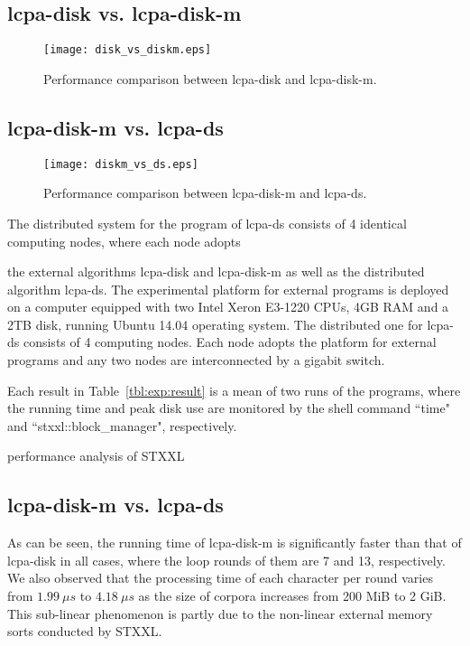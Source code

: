\documentclass[article]{IEEEtran}
\theoremstyle{definition}
\theoremstyle{remark}
\numberwithin{equation}{section}
\begin{document}
\subsection{lcpa-disk vs. lcpa-disk-m}
\begin{figure}[hbtp]
  \centering
  \texttt{[image: disk\_vs\_diskm.eps]}\\
  \caption{Performance comparison between lcpa-disk and lcpa-disk-m.}
  \label{fig:disk_vs_diskm}
\end{figure}


\subsection{lcpa-disk-m vs. lcpa-ds}

\begin{figure}[hbtp]
  \centering
  \texttt{[image: diskm\_vs\_ds.eps]}\\
  \caption{Performance comparison between lcpa-disk-m and lcpa-ds.}
  \label{fig:diskm_vs_ds}
\end{figure}

The distributed system for the program of lcpa-ds consists of 4 identical computing nodes, where each node adopts

the external algorithms lcpa-disk and lcpa-disk-m as well as the distributed algorithm lcpa-ds. The experimental platform for external programs is deployed on a computer equipped with two Intel Xeron E3-1220 CPUs, 4GB RAM and a 2TB disk,  running Ubuntu 14.04 operating system. The distributed one for lcpa-ds consists of 4 computing nodes. Each node adopts the platform for external programs and any two nodes are interconnected by a gigabit switch.


Each result in Table~\ref{tbl:exp:result} is a mean of two runs of the programs, where the running time and peak disk use are monitored by the shell command ``time" and ``stxxl::block\_manager", respectively.

performance analysis of STXXL

\subsection{lcpa-disk-m vs. lcpa-ds}


As can be seen, the running time of lcpa-disk-m is significantly faster than that of lcpa-disk in all cases, where the loop rounds of them are 7 and 13, respectively. We also observed that the processing time of each character per round varies from $1.99\ \mu s$ to $4.18\ \mu s$ as the size of corpora increases from 200 MiB to 2 GiB. This sub-linear phenomenon is partly due to the non-linear external memory sorts conducted by STXXL.
\end{document}
